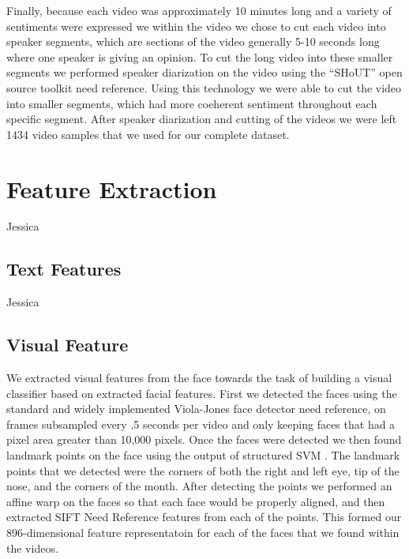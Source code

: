 \documentclass[twoside]{article}
\begin{document}
\begin{multicols}{2}
Finally, because each video was approximately 10 minutes long and a variety of sentiments were expressed we within the video we chose to cut each video into speaker segments, which are sections of the video generally 5-10 seconds long where one speaker is giving an opinion.
To cut the long video into these smaller segments we performed speaker diarization on the video using the ``SHoUT'' open source toolkit {\color{red}need reference}.
Using this technology we were able to cut the video into smaller segments, which had more coeherent sentiment throughout each specific segment.
After speaker diarization and cutting of the videos we were left 1434 video samples that we used for our complete dataset.





\section{Feature Extraction}
Jessica

\subsection{Text Features}
Jessica

\subsection{Visual Feature}
We extracted visual features from the face towards the task of building a visual classifier based on extracted facial features.
First we detected the faces using the standard and widely implemented Viola-Jones face detector {\color{red} need reference}, on frames subsampled every .5 seconds per video and only keeping faces that had a pixel area greater than 10,000 pixels.
Once the faces were detected we then found landmark points on the face using the output of structured SVM {\color{red}}.
The landmark points that we detected were the corners of both the right and left eye, tip of the nose, and the corners of the month.
After detecting the points we performed an affine warp on the faces so that each face would be properly aligned, and then extracted SIFT {\color{red}Need Reference} features from each of the points.
This formed our 896-dimensional feature representatoin for each of the faces that we found within the videos.


\end{multicols}
\end{document}
